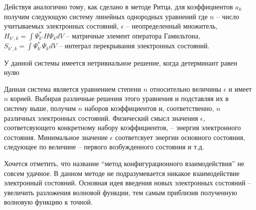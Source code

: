 Действуя аналогично тому, как сделано в методе Ритца, для коэффициентов $a_k$ получим следующую систему линейных однородных уравнений
где $n$ -- число учитываемых электронных состояний, $\epsilon$ -- неопределенный множитель, $H_{k', k} = \int\Psi_{k'}^{\ast}H\Psi_{k}dV$ -- матричные элемент оператора Гамильтона, $S_{k', k} = \int\Psi_{k'}^{\ast}\Psi_{k}dV$ -- интеграл перекрывания электронных состояний.

У данной системы имеется нетривиальное решение, когда детерминант равен нулю

Данная система является уравнением степени $n$ относительно величины $\epsilon$ и имеет $n$ корней. Выбирая различные решения этого уравнения и подставляя их в систему выше, получим $n$ наборов коэффициентов и, соответственно, $n$ различных электронных состояний. Физический смысл значения $\epsilon$, соответсвующего конкретному набору коэффициентов, -- энергия электронного состояния. Минимальное значение $\epsilon$ соответсвует энергии основного состояния, следующее по величине -- первого возбужденного состояния и т.д.

Хочется отметить, что название “метод конфигурационного взаимодействия” не совсем удачное. В данном методе не подразумевается никакое взаимодействие электронный состояний. Основная идея введения новых электронных состояний -- увеличить разложения волновой функции, тем самым приблизив полученную волновую функцию к точной.